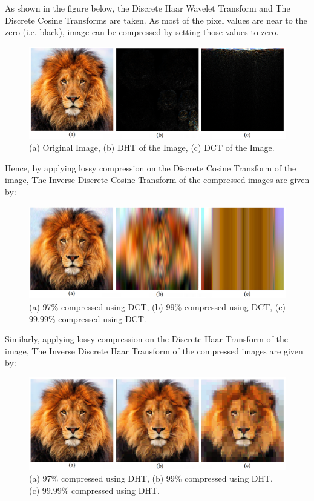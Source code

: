 \par 
As shown in the figure below, the Discrete Haar Wavelet Transform and The Discrete Cosine Transforms are taken. As most of the pixel values are near to the zero (i.e. black), image can be compressed by setting those values to zero.  

\begin{figure}[h]
    \centering
    \includegraphics[width=\textwidth]{LionDCTDHT.PNG}
    \caption{(a) Original Image, (b) DHT of the Image, (c) DCT of the Image.}
    \label{fig:imgdctdht}
\end{figure}

Hence, by applying lossy compression on the Discrete Cosine Transform of the image, The Inverse Discrete Cosine Transform of the compressed images are given by:

\begin{figure}[h]
    \centering
    \includegraphics[width=\textwidth]{LionDCTcmp.PNG}
    \caption{(a) 97\% compressed using DCT, (b) 99\% compressed using DCT, (c) 99.99\% compressed using DCT.}
    \label{fig:imgdct}
\end{figure}

Similarly, applying lossy compression on the Discrete Haar Transform of the image, The Inverse Discrete Haar Transform of the compressed images are given by:


\begin{figure}[h]
    \centering
    \includegraphics[width=\textwidth]{LionDHTcmp.PNG}
    \caption{(a) 97\% compressed using DHT, (b) 99\% compressed using DHT, (c) 99.99\% compressed using DHT.}
    \label{fig:imgdht}
\end{figure}

